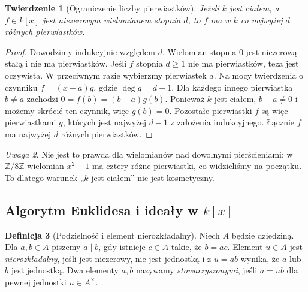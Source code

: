 \documentclass[11pt,a4paper,openany]{report}
\numberwithin{equation}{section}
\theoremstyle{plain}
\newtheorem{twierdzenie}{Twierdzenie}[section]
\theoremstyle{definition}
\newtheorem{definicja}[twierdzenie]{Definicja}
\theoremstyle{remark}
\newtheorem{uwaga}[twierdzenie]{Uwaga}
\newcommand{\Z}{\mathbb Z}
\begin{document}
\begin{twierdzenie}[Ograniczenie liczby pierwiastków]
\label{tw:korzenie}
Jeżeli $k$ jest ciałem, a $f\in k[x]$ jest niezerowym wielomianem
stopnia $d$, to $f$ ma w $k$ co najwyżej $d$ różnych pierwiastków.
\end{twierdzenie}
\begin{proof}
Dowodzimy indukcyjnie względem $d$.
Wielomian stopnia $0$ jest niezerową stałą i nie ma pierwiastków.
Jeśli $f$ stopnia $d\ge1$ nie ma pierwiastków, teza jest oczywista.
W przeciwnym razie wybierzmy pierwiastek $a$.
Na mocy twierdzenia o czynniku $f=(x-a)g$, gdzie $\deg g=d-1$.
Dla każdego innego pierwiastka $b\ne a$ zachodzi
$0=f(b)=(b-a)g(b)$.
Ponieważ $k$ jest ciałem, $b-a\ne0$ i możemy skrócić ten czynnik,
więc $g(b)=0$. Pozostałe pierwiastki $f$ są więc pierwiastkami $g$,
których jest najwyżej $d-1$ z założenia indukcyjnego.
Łącznie $f$ ma najwyżej $d$ różnych pierwiastków.
\end{proof}

\begin{uwaga}
Nie jest to prawda dla wielomianów nad dowolnymi pierścieniami:
w $\Z/8\Z$ wielomian $x^2-1$ ma cztery różne pierwiastki,
co widzieliśmy na początku. To dlatego warunek „$k$ jest ciałem”
nie jest kosmetyczny.
\end{uwaga}

\subsection{Algorytm Euklidesa i ideały w \texorpdfstring{$k[x]$}{k[x]}}

\begin{definicja}[Podzielność i element nierozkładalny]
Niech $A$ będzie dziedziną. Dla $a,b\in A$ piszemy $a\mid b$,
gdy istnieje $c\in A$ takie, że $b=ac$.
Element $u\in A$ jest \emph{nierozkładalny}, jeśli jest niezerowy,
nie jest jednostką i z $u=ab$ wynika, że $a$ lub $b$ jest jednostką.
Dwa elementy $a,b$ nazywamy \emph{stowarzyszonymi}, jeśli
$a=ub$ dla pewnej jednostki $u\in A^\times$.
\end{definicja}
\end{document}
